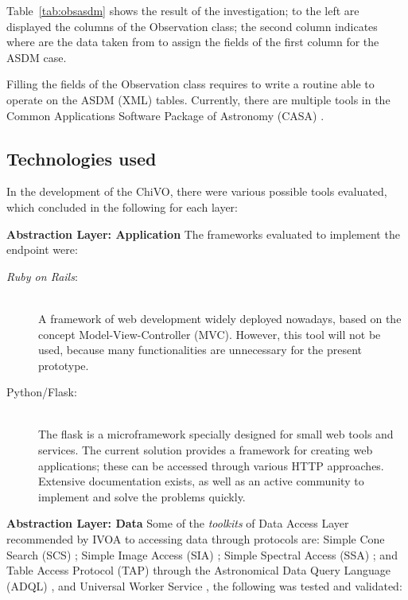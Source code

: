 \documentclass[]{spie}
\newcommand{\ror}{\emph{Ruby on Rails}}
\begin{document}
Table~\ref{tab:obsasdm} shows the result of the investigation; to the left are displayed the columns of the Observation class; the second column indicates where are the data taken from to assign the fields of the first column for the ASDM case.

Filling the fields of the Observation class requires to write a routine able to operate on the ASDM (XML) tables. Currently, there are multiple tools in the Common Applications Software Package of Astronomy (CASA) \cite{petry2012analysing}.

\subsection{Technologies used}
In the development of the ChiVO, there were various possible tools evaluated, which concluded in the following for each layer:

\textbf{Abstraction Layer:  Application}
The frameworks evaluated to implement the endpoint were: 
\begin{description}
    \item[{\ror}:] \hfill \\
        A framework of web development widely deployed nowadays, based on the concept Model-View-Controller (MVC).  However, this tool will not be used, because many functionalities are unnecessary for the present prototype.
    \item[Python/Flask:] \hfill \\
        The flask is a microframework specially designed for small web tools and services.  The current solution provides a framework for creating web applications; these can be accessed through various HTTP approaches.  Extensive documentation exists, as well as an active community to implement and solve the problems quickly.
\end{description}

\textbf{Abstraction Layer: Data}
Some of the \emph{toolkits} of Data Access Layer recommended by IVOA to accessing data through protocols are:  Simple Cone Search (SCS) \cite{williams2008simple}; Simple Image Access (SIA) \cite{tody2004simple}; Simple Spectral Access (SSA) \cite{tody2008simple}; and Table Access Protocol (TAP) \cite{dowler2010table} through the Astronomical Data Query Language (ADQL) \cite{yasuda2004astronomical}, and Universal Worker Service \cite{rixon2008universal}, the following was tested and validated:
\end{document}
